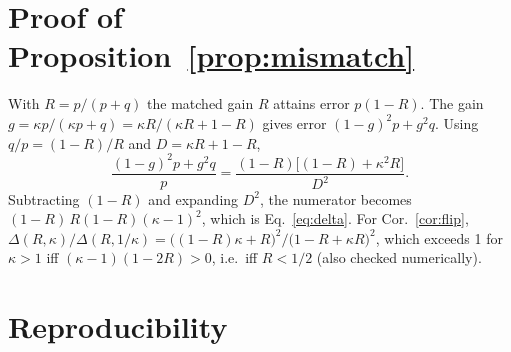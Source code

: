 \section{Proof of Proposition~\ref{prop:mismatch}}\label{app:proof}
With $R=p/(p+q)$ the matched gain $R$ attains error $p(1-R)$. The gain
$g=\kappa p/(\kappa p+q)=\kappa R/(\kappa R+1-R)$ gives error
$(1-g)^2p+g^2q$. Using $q/p=(1-R)/R$ and $D=\kappa R+1-R$,
\[
\frac{(1-g)^2p+g^2q}{p}=\frac{(1-R)\big[(1-R)+\kappa^2R\big]}{D^2}.
\]
Subtracting $(1-R)$ and expanding $D^2$, the numerator becomes
$(1-R)\,R(1-R)(\kappa-1)^2$, which is Eq.~\eqref{eq:delta}.
For Cor.~\ref{cor:flip},
$\Delta(R,\kappa)/\Delta(R,1/\kappa)=\big((1-R)\kappa+R\big)^2/\big(1-R+\kappa R\big)^2$,
which exceeds 1 for $\kappa>1$ iff $(\kappa-1)(1-2R)>0$, i.e.\ iff $R<1/2$
(also checked numerically).

\section{Reproducibility}
